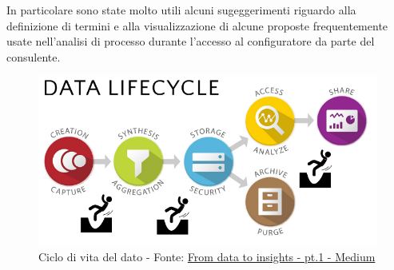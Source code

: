 In particolare sono state molto utili alcuni sugeggerimenti riguardo alla definizione di termini e alla visualizzazione di alcune proposte frequentemente usate nell'analisi di processo durante l'accesso al configuratore da parte del consulente.

\begin{figure}[H]
    \centering
    \includegraphics[width=0.80\columnwidth]{immagini/data_lifecycle.png}
    \caption{Ciclo di vita del dato - Fonte: \href{https://medium.com/digital-transformation-in-the-asset-management/from-data-to-insights-the-immediate-pitfalls-part-i-data-creation-collection-7948568c0059}{From data to insights - pt.1 - Medium}}
    \label{fig:my_label}
\end{figure}